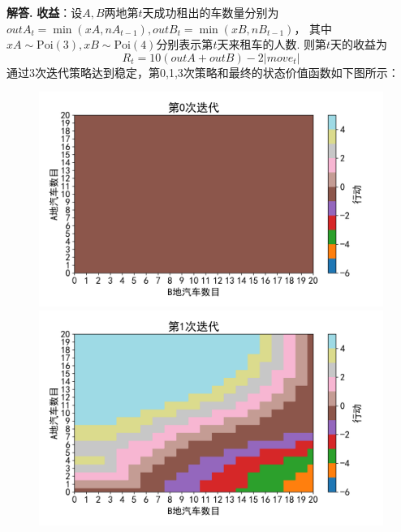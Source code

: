 \documentclass[12pt, a4paper, oneside]{ctexart}
\newenvironment{solution}[1][]{\par\noindent\textbf{#1解答. }}{\smallskip\par}  %
\begin{document}
\begin{solution}
    \textbf{收益}：设$A,B$两地第$t$天成功租出的车数量分别为$outA_t = \min(xA, nA_{t-1}), outB_t = \min(xB, nB_{t-1})$，
    其中$xA\sim \text{Poi}(3),xB\sim \text{Poi}(4)$分别表示第$t$天来租车的人数. 则第$t$天的收益为
    \begin{equation*}
        R_t = 10(outA + outB) - 2|move_t|
    \end{equation*}
    通过3次迭代策略达到稳定，第0,1,3次策略和最终的状态价值函数如下图所示：
    \begin{figure}[htbp]
        \hspace{-2.2cm}
        \subfigure  %
        {
            \begin{minipage}[b]{.6\linewidth}
                \centering
                \includegraphics[scale=0.52]{078/078页例题4.2policy0.png}
            \end{minipage}
        }
        \subfigure
        {
            \begin{minipage}[b]{.2\linewidth}
                \centering
                \includegraphics[scale=0.52]{078/078页例题4.2policy1.png}

\end{minipage}}
\end{figure}
\end{solution}
\end{document}
